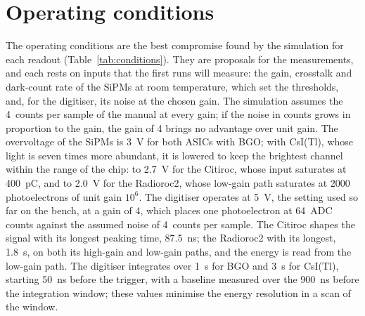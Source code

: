 \documentclass[11pt]{article}
\newcommand{\us}{\textmu s\xspace}
\newcommand{\csitl}{CsI(Tl)\xspace}
\begin{document}
\section{Operating conditions}
\label{sec:conditions}

The operating conditions are the best compromise found by the simulation
for each readout (Table~\ref{tab:conditions}). They are proposals for the
measurements, and each rests on inputs that the first runs will measure:
the gain, crosstalk and dark-count rate of the SiPMs at room temperature,
which set the thresholds, and, for the digitiser, its noise at the chosen
gain. The simulation assumes the 4~counts per sample of the manual at every
gain; if the noise in counts grows in proportion to the gain, the gain
of 4 brings no advantage over unit gain. The overvoltage of the SiPMs is 3~V for both
ASICs with BGO; with \csitl, whose light is seven times more abundant, it
is lowered to keep the brightest channel within the range of the chip:
to 2.7~V for the Citiroc, whose input saturates at 400~pC, and to 2.0~V for
the Radioroc2, whose low-gain path saturates at 2000 photoelectrons of
unit gain $10^6$. The digitiser operates at 5~V, the setting used so far
on the bench, at a gain of 4, which places one photoelectron at 64~ADC
counts against the assumed noise of 4~counts per sample. The Citiroc shapes the
signal with its longest peaking time, 87.5~ns; the Radioroc2 with its
longest, 1.8~\us, on both its high-gain and low-gain paths, and the
energy is read from the low-gain path. The digitiser integrates over
1~\us for BGO and 3~\us for \csitl, starting 50~ns before the trigger,
with a baseline measured over the 900~ns before the integration window;
these values minimise the energy resolution in a scan of the window.
\end{document}
